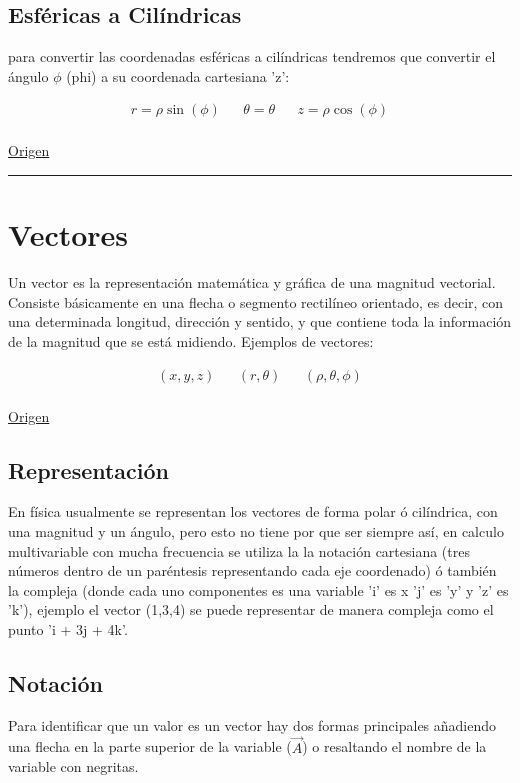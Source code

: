 \documentclass{article}
\begin{document}
\subsection{Esféricas a Cilíndricas}
\label{sec:org40ac628}
para convertir las coordenadas esféricas a cilíndricas tendremos que convertir el ángulo \(\phi\) (phi) a su coordenada cartesiana 'z':

\[\begin{aligned}
 r = \rho \sin(\phi) && 
 \theta = \theta &&
 z = \rho \cos(\phi) \\
\end{aligned}\] 

\href{https://temasdecalculo.com/2017/12/18/4-14-coordenadas-cilindricas-y-coordenadas-esfericas-calculo-vectorial/}{Origen}

\noindent\rule{\textwidth}{0.5pt}

\section{Vectores}
\label{sec:orgeda1d43}
Un vector es la representación matemática y gráfica de una magnitud vectorial. Consiste básicamente en una flecha o segmento rectilíneo orientado, es decir, con una determinada longitud, dirección y sentido, y que contiene toda la información de la magnitud que se está midiendo. Ejemplos de vectores: 

\[\begin{aligned}
  (x,y,z) && (r,\theta) && (\rho, \theta, \phi) \\
\end{aligned}\] 

\href{https://ingemecanica.com/tutoriales/calculo\_vectorial.html}{Origen}

\subsection{Representación}
\label{sec:org12eb311}
En física usualmente se representan los vectores de forma polar ó cilíndrica, con una magnitud y un ángulo, pero esto no tiene por que ser siempre así, en calculo multivariable con mucha frecuencia se utiliza la la notación cartesiana (tres números dentro de un paréntesis representando cada eje coordenado) ó también la compleja (donde cada uno componentes es una variable 'i' es x 'j' es 'y' y 'z' es 'k'), ejemplo el vector (1,3,4) se puede representar de manera compleja como el punto 'i + 3j + 4k'. 

\subsection{Notación}
\label{sec:org7977f06}
Para identificar que un valor es un vector hay dos formas principales añadiendo una flecha en la parte superior de la variable (\(\vec{A}\)) o resaltando el nombre de la variable con negritas. 
\end{document}
